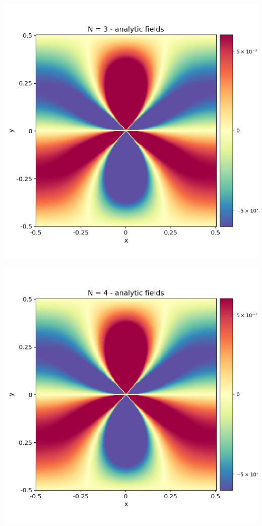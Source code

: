 \documentclass[12pt,a4paper]{article}
\theoremstyle{plain}
\begin{document}
\begin{multicols*}{2}
\begin{minipage}{0.22\columnwidth}
	\end{minipage}
	\begin{minipage}{0.22\columnwidth}
		\centering
		\includegraphics[width=\columnwidth]{./stress_field_03.png}
	\end{minipage}
	\begin{minipage}{0.22\columnwidth}
		\centering
		\includegraphics[width=\columnwidth]{./stress_field_04.png}
	\end{minipage}


\end{multicols*}
\end{document}
